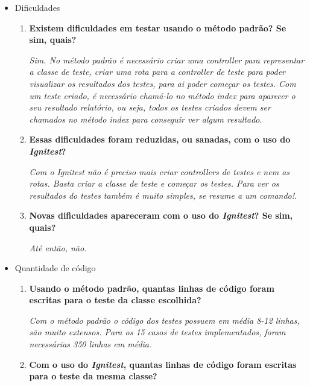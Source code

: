 \begin{itemize}
\begin{itemize}
\begin{enumerate}
                    \end{enumerate}
                \item Dificuldades
                    \begin{enumerate}
                        \item \textbf{Existem dificuldades em testar usando o método padrão? Se sim, quais?}
                        
			  \subitem \textit{Sim. No método padrão é necessário criar uma controller para representar a classe de teste,
				    criar uma rota para a controller de teste para poder visualizar os resultados dos testes, para ai
				    poder começar os testes. Com um teste criado, é necessário chamá-lo no método index para aparecer
				    o seu resultado relatório, ou seja, todos os testes criados devem ser chamados no método index para
				    conseguir ver algum resultado}.
			  
                        \item \textbf{Essas dificuldades foram reduzidas, ou sanadas, com o uso do \textit{Ignitest}?}
                        
			  \subitem \textit{Com o Ignitest não é preciso mais criar controllers de testes e nem as rotas. Basta criar 
				    a classe de teste e começar os testes. Para ver os resultados do testes também é muito simples, 
				    se resume a um comando!}.
			  
                        \item \textbf{Novas dificuldades apareceram com o uso do \textit{Ignitest}? Se sim, quais?}
                        
			  \subitem \textit{Até então, não}.
			  
                    \end{enumerate}
                \item Quantidade de código
                    \begin{enumerate}
                        \item \textbf{Usando o método padrão, quantas linhas de código foram escritas para o teste da classe escolhida?}
			  
			  \subitem \textit{Com o método padrão o código dos testes possuem em média 8-12 linhas, são muito extensos.
				    Para os 15 casos de testes implementados, foram necessárias 350 linhas em média}.
			  
                        \item \textbf{Com o uso do \textit{Ignitest}, quantas linhas de código foram escritas para o teste da mesma classe?}
			  

\end{enumerate}
\end{itemize}
\end{itemize}
